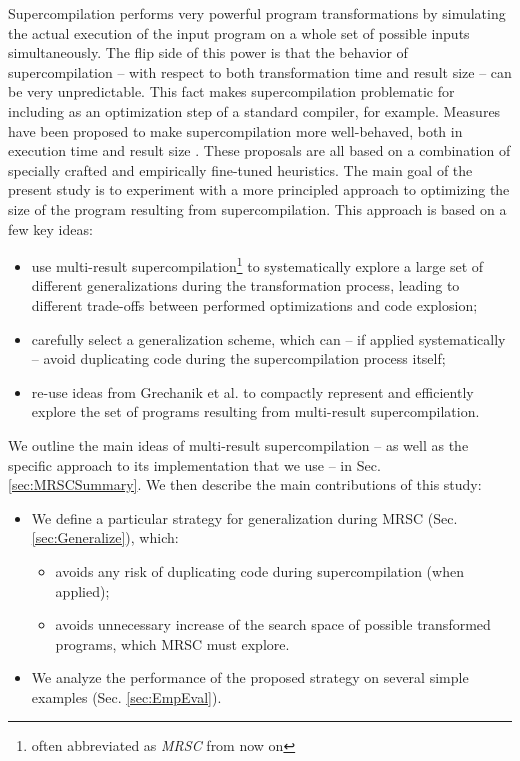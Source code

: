 \documentclass[submission,copyright,creativecommons]{eptcs}
\begin{document}
Supercompilation performs very powerful program transformations by simulating
the actual execution of the input program on a whole set of possible inputs
simultaneously.
The flip side of this power is that the behavior of supercompilation -- 
with respect to both transformation time and result size --
can be very unpredictable.
This fact makes supercompilation problematic for including as an
optimization step of a standard compiler, for example.
Measures have been proposed to make supercompilation more
well-behaved, both in execution time and result size \cite{bolingbroke2011improving,Jonsson2011Taming}.
These proposals are all based on a combination of specially crafted and
empirically fine-tuned heuristics.
The main goal of the present study is to experiment with a more
principled approach to optimizing the size of the program resulting
from supercompilation.
This approach is based on a few key ideas:
\begin{itemize}
  \item use multi-result supercompilation\footnote{often abbreviated as \emph{MRSC} from now on} 
    \cite{KlyuchnikovMRSCBranch,Klyuchnikov:META2012:MRSC,Romanenko2014StagedMRSC}
    to systematically explore a large set of different generalizations during 
    the transformation process, 
    leading to different trade-offs between performed optimizations and code explosion;
  \item carefully select a generalization scheme, which can -- if applied systematically -- avoid duplicating
    code during the supercompilation process itself;
  \item re-use ideas from Grechanik et al. \cite{Romanenko2014StagedMRSC} to compactly represent and efficiently
    explore the set of programs resulting from multi-result supercompilation.
\end{itemize}
We outline the main ideas of multi-result supercompilation --
as well as the specific approach to its implementation that we use --
in Sec. \ref{sec:MRSCSummary}. We then describe the main contributions of this study:
\begin{itemize}
  \item We define a particular strategy for generalization during MRSC (Sec. \ref{sec:Generalize}), which:
    \begin{itemize}
      \item avoids any risk of duplicating code during supercompilation (when applied);
      \item avoids unnecessary increase of the search space of possible
        transformed programs, which MRSC must explore.
    \end{itemize}
  \item We analyze the performance of the proposed strategy on several
    simple examples (Sec. \ref{sec:EmpEval}).
\end{itemize}
\end{document}
